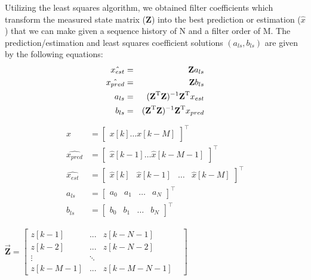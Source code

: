 \documentclass[twocolumn,letterpaper]{IEEEAerospaceCLS}  %
\begin{document}
Utilizing the least squares algorithm, we obtained filter coefficients which transform the measured state matrix (\textbf{Z}) into the best prediction or estimation ($\hat{x}$) that we can make given a sequence history of N and a filter order of M. The prediction/estimation and least squares coefficient solutions $(a_{ls}, b_{ls})$ are given by the following equations:
\begin{eqnarray*}
\hat{x_{est}}&=&\textbf{Z}a_{ls} \\ 
\hat{x_{pred}}&=&\textbf{Z}b_{ls} \\ 
a_{ls}&=&(\textbf{Z}^{\rm T}\textbf{Z})^{-1}\textbf{Z}^{\rm T}x_{est} \\
b_{ls}&=&(\textbf{Z}^{\rm T}\textbf{Z})^{-1}\textbf{Z}^{\rm T}x_{pred}
\end{eqnarray*}
\begin{align}
\begin{aligned}
x&= \left[ \begin{matrix}  x[k]   \dots    x[k-M] \end{matrix} \right]^\top\\
\hat{x_{pred}} &= \left[ \begin{matrix} \hat{x}[k-1]  \dots \hat{x}[k-M-1]\end{matrix} \right]^\top\\
\hat{x_{est}} &= \left[ \begin{matrix}   \hat{x}[k]  & \hat{x}[k-1]  &  \dots & \hat{x}[k-M]\end{matrix}\right]^\top\\ \nonumber
a_{ls}&=  \left[ \begin{matrix}    a_{0} &  a_{1} &  \dots  & a_{N} \end{matrix} \right]^\top\\
b_{ls}&= \left[ \begin{matrix}   b_{0}   & b_{1}  & \dots &  b_{N}\end{matrix}\right]^\top
\end{aligned}
\end{align}

$\vec{\textbf{Z}} = \begin{bmatrix}
   z[k-1]   & ...       & z[k-N-1]     & \\
   z[k-2]   & ...       & z[k-N-2]     & \\
   \vdots             &  \ddots   &              & \\
   z[k-M-1] & ...       & z[k-M-N-1]  
\end{bmatrix}$
\end{document}
